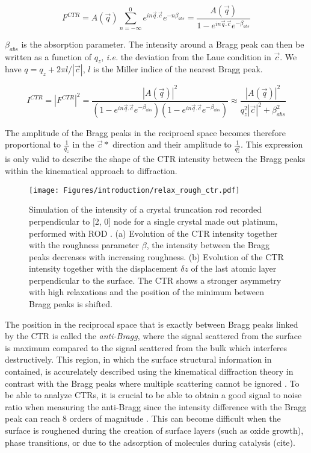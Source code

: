 \begin{equation}
    \label{eq:CTR1}
    F^{CTR} = A(\vec{q})\sum_{n=-\infty}^0 e^{in\vec{q}.\vec{c}} e^{-n\beta_{abs}} = \frac{A(\vec{q})}{1 - e^{in\vec{q}.\vec{c}} e^{-\beta_{abs}}}
\end{equation}

$\beta_{abs}$ is the absorption parameter.
The intensity around a Bragg peak can then be written as a function of $q_z$, \textit{i.e.} the deviation from the Laue condition in $\vec{c}$. We have $q = q_z + 2\pi l/|\vec{c}|$, $l$ is the Miller indice of the nearest Bragg peak.

\begin{equation}
    \label{eq:CTR2}
    I^{CTR} = |F^{CTR}|^2 = \frac{|A(\vec{q})|^2}{(1 - e^{in\vec{q}.\vec{c}} e^{-\beta_{abs}})(1 - e^{in\vec{q}.\vec{c}} e^{-\beta_{abs}})} \approx \frac{|A(\vec{q})|^2}{q_z^2 |\vec{c}|^2 + \beta_{abs}^2 }
\end{equation}

The amplitude of the Bragg peaks in the reciprocal space becomes therefore proportional to $\frac{1}{q_z}$ in the $\vec{c}*$ direction and their amplitude to $\frac{1}{q_z^2}$.
This expression is only valid to describe the shape of the CTR intensity between the Bragg peaks within the kinematical approach to diffraction.

\begin{figure}[!htb]
    \centering
    \texttt{[image: Figures/introduction/relax\_rough\_ctr.pdf]}
    \caption{
    Simulation of the intensity of a crystal truncation rod recorded perpendicular to [2, 0] node for a single crystal made out platinum, performed with ROD \parencite{Vlieg2000}.
    (a) Evolution of the CTR intensity together with the roughness parameter $\beta$, the intensity between the Bragg peaks decreases with increasing roughness.
    (b) Evolution of the CTR intensity together with the displacement $\delta z$ of the last atomic layer perpendicular to the surface.
    The CTR shows a stronger asymmetry with high relaxations and the position of the minimum between Bragg peaks is shifted.
    }
    \label{fig:CTRSimulation}
\end{figure}

The position in the reciprocal space that is exactly between Bragg peaks linked by the CTR is called the \textit{anti-Bragg}, where the signal scattered from the surface is maximum compared to the signal scattered from the bulk which interferes destructively.
This region, in which the surface structural information in contained, is accurelately described using the kinematical diffraction theory in contrast with the Bragg peaks where multiple scattering cannot be ignored \parencite{Kaganer2007}.
To be able to analyze CTRs, it is crucial to be able to obtain a good signal to noise ratio when measuring the anti-Bragg since the intensity difference with the Bragg peak can reach 8 orders of magnitude \parencite{Fadenberger2010InSO}.
This can become difficult when the surface is roughened during the creation of surface layers (such as oxide growth), phase transitions, or due to the adsorption of molecules during catalysis (cite).


